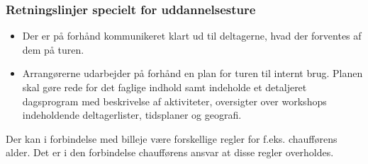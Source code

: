 \subsubsection{Retningslinjer specielt for uddannelsesture}
\begin{itemize}
\item Der er på forhånd kommunikeret klart ud til deltagerne, hvad der forventes af dem på turen.
\item Arrangørerne udarbejder på forhånd en plan for turen til internt brug. Planen skal gøre rede for det faglige
indhold samt indeholde et detaljeret dagsprogram med beskrivelse af aktiviteter, oversigter over workshops
indeholdende deltagerlister, tidsplaner og geografi.
\end{itemize}
Der kan i forbindelse med billeje være forskellige regler for f.eks. chaufførens alder. Det er i den forbindelse
chaufførens ansvar at disse regler overholdes.